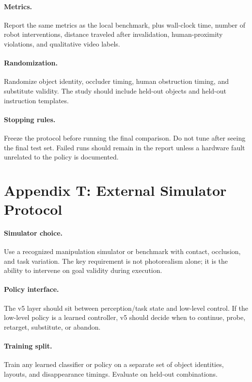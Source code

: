 \documentclass{article}
\begin{document}
\paragraph{Metrics.}
Report the same metrics as the local benchmark, plus wall-clock time, number of robot interventions, distance traveled after invalidation, human-proximity violations, and qualitative video labels.

\paragraph{Randomization.}
Randomize object identity, occluder timing, human obstruction timing, and substitute validity. The study should include held-out objects and held-out instruction templates.

\paragraph{Stopping rules.}
Freeze the protocol before running the final comparison. Do not tune after seeing the final test set. Failed runs should remain in the report unless a hardware fault unrelated to the policy is documented.

\section{Appendix T: External Simulator Protocol}
\paragraph{Simulator choice.}
Use a recognized manipulation simulator or benchmark with contact, occlusion, and task variation. The key requirement is not photorealism alone; it is the ability to intervene on goal validity during execution.

\paragraph{Policy interface.}
The v5 layer should sit between perception/task state and low-level control. If the low-level policy is a learned controller, v5 should decide when to continue, probe, retarget, substitute, or abandon.

\paragraph{Training split.}
Train any learned classifier or policy on a separate set of object identities, layouts, and disappearance timings. Evaluate on held-out combinations.
\end{document}
